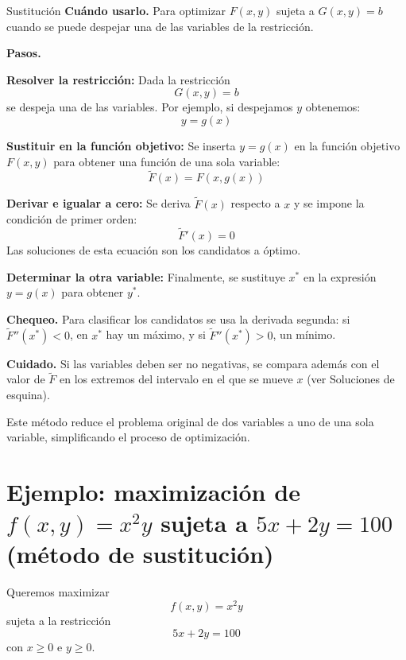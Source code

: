 \documentclass{article}
\newcommand{\rotulo}[2][principal]{\textsf{\bfseries\color{#1}#2}\enspace}
\begin{document}
\begin{metodo}[label=met:sustitucion]{Sustitución}
\rotulo{Cuándo usarlo.} Para optimizar \(F(x,y)\) sujeta a \(G(x,y)=b\) cuando se puede despejar una de las variables de la restricción.
 
\rotulo{Pasos.}
\begin{pasos}
    \item \textbf{Resolver la restricción:}
    Dada la restricción
    \[
    G(x,y)=b
    \]
    se despeja una de las variables. Por ejemplo, si despejamos \(y\) obtenemos:
    \[
    y = g(x)
    \]
 
    \item \textbf{Sustituir en la función objetivo:}
    Se inserta \(y = g(x)\) en la función objetivo \(F(x,y)\) para obtener una función de una sola variable:
    \[
    \tilde F(x) = F(x, g(x))
    \]
 
    \item \textbf{Derivar e igualar a cero:}
    Se deriva \(\tilde F(x)\) respecto a \(x\) y se impone la condición de primer orden:
    \[
    \tilde F'(x) = 0
    \]
    Las soluciones de esta ecuación son los candidatos a óptimo.
 
    \item \textbf{Determinar la otra variable:}
    Finalmente, se sustituye \(x^*\) en la expresión \(y = g(x)\) para obtener \(y^*\).
\end{pasos}
 
\rotulo{Chequeo.} Para clasificar los candidatos se usa la derivada segunda: si \(\tilde F''(x^*)<0\), en \(x^*\) hay un máximo, y si \(\tilde F''(x^*)>0\), un mínimo.
 
\rotulo{Cuidado.} Si las variables deben ser no negativas, se compara además con el valor de \(\tilde F\) en los extremos del intervalo en el que se mueve \(x\) (ver Soluciones de esquina).
\end{metodo}
 
Este método reduce el problema original de dos variables a uno de una sola variable, simplificando el proceso de optimización.
 
 
\section*{Ejemplo: maximización de \(f(x,y)=x^2y\) sujeta a \(5x+2y=100\) (método de sustitución)}
 
Queremos maximizar
\[
f(x,y)=x^2y
\]
sujeta a la restricción
\[
5x+2y=100
\]
con \(x\geq 0\) e \(y\geq 0\).
 
\end{document}
